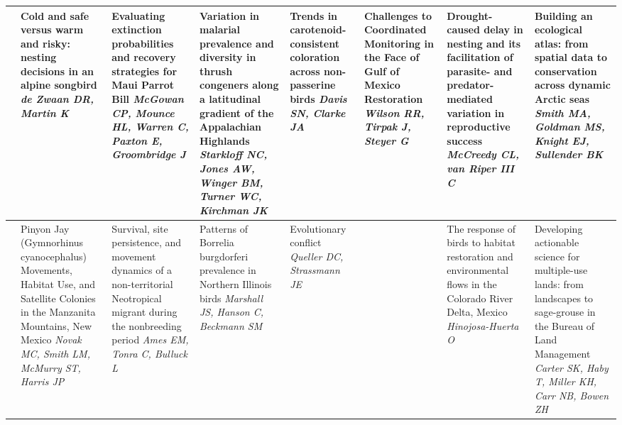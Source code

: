 \begin{tabular}{|x{0.85cm}|x{2.85cm}|x{2.85cm}|x{2.85cm}|x{2.85cm}|a{2.85cm}|a{2.85cm}|a{2.85cm}|}
&Cold and safe versus warm and risky: nesting decisions in an alpine songbird \newline \newline \textit{de Zwaan DR, Martin K} & Evaluating extinction probabilities and recovery strategies for Maui Parrot Bill \newline \newline \textit{McGowan CP, Mounce HL, Warren C, Paxton E, Groombridge J} & Variation in malarial prevalence and diversity in thrush congeners along a latitudinal gradient of the Appalachian Highlands \newline \newline \textit{Starkloff NC, Jones AW, Winger BM, Turner WC, Kirchman JK} & Trends in carotenoid-consistent coloration across non-passerine birds \newline \newline \textit{Davis SN, Clarke JA} & Challenges to Coordinated Monitoring in the Face of Gulf of Mexico Restoration \newline \newline \textit{Wilson RR, Tirpak J, Steyer G} & Drought-caused delay in nesting and its facilitation of parasite- and predator-mediated variation in reproductive success \newline \newline \textit{McCreedy CL, van Riper III C} & Building an ecological atlas: from spatial data to conservation across dynamic Arctic seas \newline \newline \textit{Smith MA, Goldman MS, Knight EJ, Sullender BK}\\
\hline
{}&Pinyon Jay (Gymnorhinus cyanocephalus) Movements, Habitat Use, and Satellite Colonies in the Manzanita Mountains, New Mexico \newline \newline \textit{Novak MC, Smith LM, McMurry ST, Harris JP} & Survival, site persistence, and movement dynamics of a non-territorial Neotropical migrant during the nonbreeding period \newline \newline \textit{Ames EM, Tonra C, Bulluck L} & Patterns of Borrelia burgdorferi prevalence in Northern Illinois birds \newline \newline \textit{Marshall JS, Hanson C, Beckmann SM} & Evolutionary conflict \newline \newline \textit{Queller DC, Strassmann JE} & & The response of birds to habitat restoration and environmental flows in the Colorado River Delta, Mexico \newline \newline \textit{Hinojosa-Huerta O} & Developing actionable science for multiple-use lands: from landscapes to sage-grouse in the Bureau of Land Management \newline \newline \textit{Carter SK, Haby T, Miller KH, Carr NB, Bowen ZH}\\

\end{tabular}
